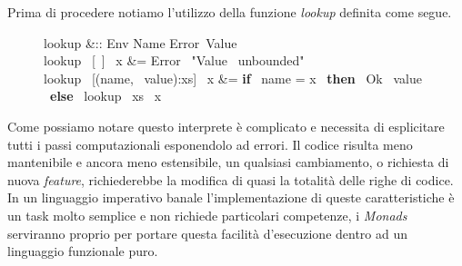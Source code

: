 Prima di procedere notiamo l'utilizzo della funzione \textit{lookup} definita come segue.

\begin{figure}[H]
  \centering
  \footnotesize %
  \begin{haskellsyntax}
  lookup &:: Env \to Name \to Error\ Value \\
  lookup \ [\ ] \ x &= Error \ "Value \ unbounded"\\
  lookup \ [(name, \ value):xs] \ x &= \textbf{if} \ name = x \
                                          \textbf{then} \ Ok \ value \
                                          \textbf{else} \ lookup \ xs \ x
  \end{haskellsyntax}%
\end{figure}

Come possiamo notare questo interprete è complicato e necessita di esplicitare
tutti i passi computazionali esponendolo ad errori.
Il codice risulta meno mantenibile e ancora meno estensibile, un qualsiasi
cambiamento, o richiesta di nuova \textit{feature}, richiederebbe la modifica
di quasi la totalità delle righe di codice.
In un linguaggio imperativo banale l'implementazione di queste caratteristiche
è un task molto semplice e non richiede particolari competenze, i
\textit{Monads} serviranno proprio per portare questa facilità d'esecuzione
dentro ad un linguaggio funzionale puro.


\newpage
